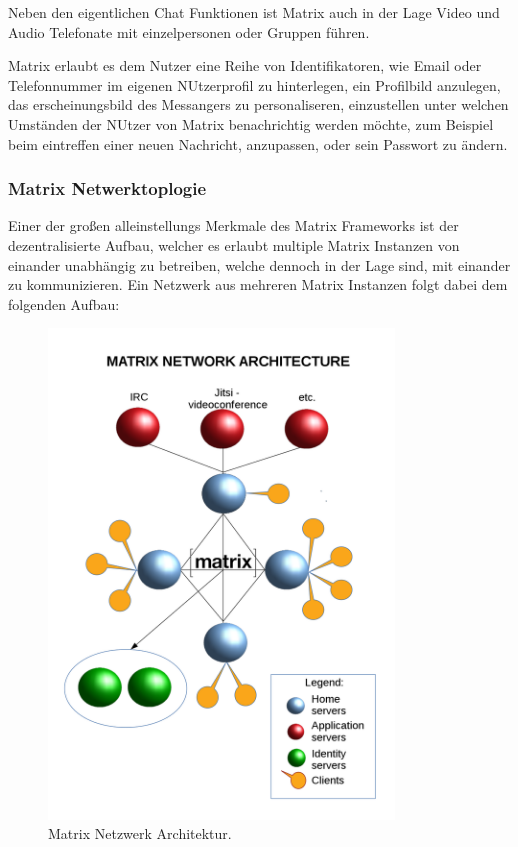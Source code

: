 Neben den eigentlichen Chat Funktionen ist Matrix auch in der Lage Video und Audio Telefonate mit einzelpersonen oder Gruppen führen.

Matrix erlaubt es dem Nutzer eine Reihe von Identifikatoren, wie Email oder Telefonnummer im eigenen NUtzerprofil zu hinterlegen, ein Profilbild anzulegen, das erscheinungsbild des Messangers zu personaliseren, einzustellen unter welchen Umständen der NUtzer von Matrix benachrichtig werden möchte, zum Beispiel beim eintreffen einer neuen Nachricht, anzupassen, oder sein Passwort zu ändern.  

\subsubsection{Matrix Netwerktoplogie}\label{chapter:aemn}
Einer der großen alleinstellungs Merkmale des Matrix Frameworks ist der dezentralisierte Aufbau, welcher es erlaubt multiple Matrix Instanzen von einander unabhängig zu betreiben, welche dennoch in der Lage sind, mit einander zu kommunizieren. Ein Netzwerk aus mehreren Matrix Instanzen folgt dabei dem folgenden Aufbau:
\begin{figure}[htb]
    \centering
    \includegraphics[height=13cm]{graphics/1280px-Diagramme_Matrix_en.png}
    \caption[Matrix Netzwerk Architektur]{Matrix Netzwerk Architektur.\footnotemark}
    \label{abb:DHBWLogo}
\end{figure}
